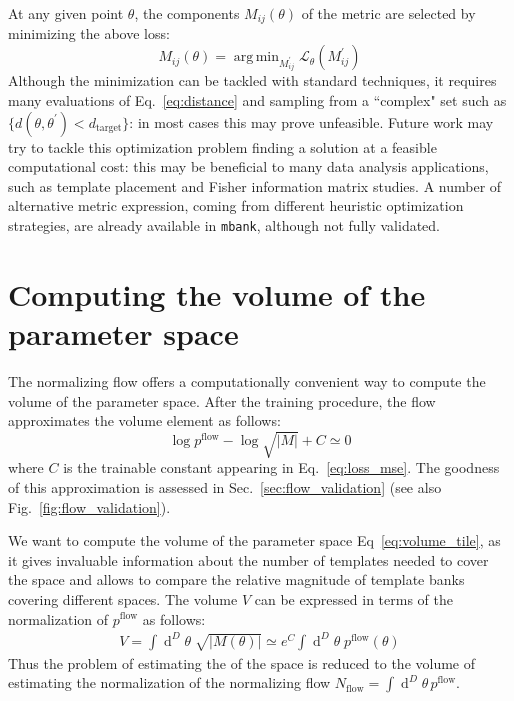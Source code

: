\documentclass[twocolumn,showpacs,preprintnumbers,nofootinbib,prd,
superscriptaddress,10pt]{revtex4-2}
\newcommand{\dvol}[2]{\ensuremath{\operatorname{d}^{#2}\!{#1}}}
\DeclareMathOperator*{\argmin}{arg\,min}
\begin{document}
At any given point $\theta$, the components $M_{ij}(\theta)$ of the metric are selected by minimizing the above loss:
\begin{equation} \label{eq:metric_optmization}
	M_{ij}(\theta) = \argmin_{M^\prime_{ij}}  \mathcal{L}_\theta(M^\prime_{ij})
\end{equation}
Although the minimization can be tackled with standard techniques, it requires many evaluations of Eq.~\eqref{eq:distance} and sampling from a ``complex" set such as ${\{d(\theta,\theta^\prime) < d_\mathrm{target}\}}$: in most cases this may prove unfeasible.
Future work may try to tackle this optimization problem finding a solution at a feasible computational cost: this may be beneficial to many data analysis applications, such as template placement and Fisher information matrix studies.
A number of alternative metric expression, coming from different heuristic optimization strategies, are already available in \texttt{mbank}, although not fully validated.


\section{Computing the volume of the parameter space}\label{app:parameter_space_volume}

The normalizing flow offers a computationally convenient way to compute the volume of the parameter space.
After the training procedure, the flow approximates the volume element as follows:
\begin{equation}
	\log p^\text{flow} - \log\sqrt{|M|} + C \simeq 0
\end{equation}
where $C$ is the trainable constant appearing in Eq.~\eqref{eq:loss_mse}.
The goodness of this approximation is assessed in Sec.~\ref{sec:flow_validation} (see also Fig.~\ref{fig:flow_validation}).

We want to compute the volume of the parameter space Eq~\eqref{eq:volume_tile}, as it gives invaluable information about the number of templates needed to cover the space \cite{owen_metric} and allows to compare the relative magnitude of template banks covering different spaces.
The volume $V$ can be expressed in terms of the normalization of $p^\text{flow}$ as follows:
\begin{align}
	 V = \int \dvol{\theta}{D} \; \sqrt{|M(\theta)|} \simeq  e^C \int \dvol{\theta}{D} \; p^\text{flow}(\theta)
\end{align}
%
Thus the problem of estimating the of the space is reduced to the volume of estimating the normalization of the normalizing flow $N_\text{flow} = \int \dvol{\theta}{D} \, p^\text{flow}$.
\end{document}
